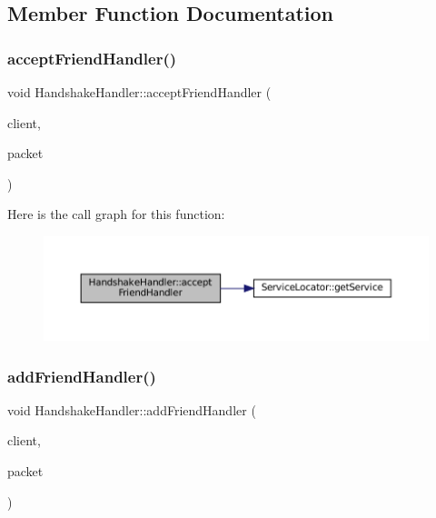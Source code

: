 \subsection{Member Function Documentation}
\mbox{\label{classHandshakeHandler_a943b521a7ffadc5e339b9c32ced09c67}} 
\subsubsection{\texorpdfstring{accept\+Friend\+Handler()}{acceptFriendHandler()}}
{\footnotesize\ttfamily void Handshake\+Handler\+::accept\+Friend\+Handler (\begin{DoxyParamCaption}\item[{boost\+::shared\+\_\+ptr$<$ \mbox{\hyperlink{classClient}{Client}} $>$}]{client,  }\item[{std\+::unique\+\_\+ptr$<$ I\+Packet $>$ \&}]{packet }\end{DoxyParamCaption})\hspace{0.3cm}{\ttfamily [static]}}

Here is the call graph for this function\+:
\nopagebreak
\begin{figure}[H]
\begin{center}
\leavevmode
\includegraphics[width=350pt]{classHandshakeHandler_a943b521a7ffadc5e339b9c32ced09c67_cgraph}
\end{center}
\end{figure}
\mbox{\label{classHandshakeHandler_aa0ebcde41ffa598adaa99c6e55389344}} 
\subsubsection{\texorpdfstring{add\+Friend\+Handler()}{addFriendHandler()}}
{\footnotesize\ttfamily void Handshake\+Handler\+::add\+Friend\+Handler (\begin{DoxyParamCaption}\item[{boost\+::shared\+\_\+ptr$<$ \mbox{\hyperlink{classClient}{Client}} $>$}]{client,  }\item[{std\+::unique\+\_\+ptr$<$ I\+Packet $>$ \&}]{packet }\end{DoxyParamCaption})\hspace{0.3cm}{\ttfamily [static]}}

